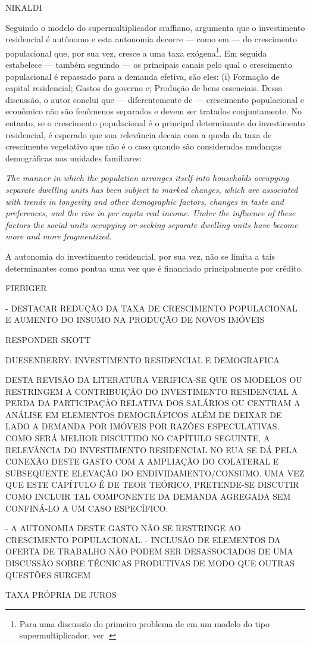 NIKALDI

Seguindo o modelo do supermultiplicador sraffiano, \textcite{gowans_introducing_2014} argumenta que o investimento residencial é autônomo e esta autonomia decorre --- como em \textcite{hansen_economic_1939} --- do crescimento populacional que, por sua vez, cresce a uma taxa exógena\footnote{
	Para uma discussão do primeiro problema de \textcite{harrod_essay_1939} em um modelo do tipo supermultiplicador, ver \textcite{allain_demographic_2018}.
}.
Em seguida estabelece --- também seguindo \textcite{hansen_economic_1939} --- os principais canais pelo qual o crescimento populacional é repassado para a demanda efetiva, são eles: (i) Formação de capital residencial; Gastos do governo e; Produção de bens essenciais.
Dessa discussão, o autor conclui que --- diferentemente de \textcite{robinson_model_1962} --- crescimento populacional e econômico não são fenômenos separados e devem ser tratados conjuntamente.
No entanto, se o crescimento populacional é o principal determinante do investimento residencial, é esperado que sua relevância decaia com a queda da taxa de crescimento vegetativo que não é o caso quando são consideradas mudanças demográficas nas unidades familiares:

\begin{citacao}
	\textit{The manner in which the population arranges itself into households
	occupying separate dwelling units has been subject to marked changes,
	which are associated with trends in longevity and other demographic
	factors, changes in taste and preferences, and the rise in per capita real
	income. Under the influence of these factors the social units occupying
	or seeking separate dwelling units have become more and more fragmentized.}
	\cite[p.~11]{grebler_capital_1956}
\end{citacao}

A autonomia do investimento residencial, por sua vez, não se limita a tais determinantes como pontua \textcite{fiebiger_semi-autonomous_2018} uma vez que é financiado principalmente por crédito.

FIEBIGER

- DESTACAR REDUÇÃO DA TAXA DE CRESCIMENTO POPULACIONAL E AUMENTO DO INSUMO NA PRODUÇÃO DE NOVOS IMÓVEIS


RESPONDER SKOTT


DUESENBERRY: INVESTIMENTO RESIDENCIAL E DEMOGRAFICA


DESTA REVISÃO DA LITERATURA VERIFICA-SE QUE OS MODELOS OU RESTRINGEM A CONTRIBUIÇÃO DO INVESTIMENTO RESIDENCIAL A PERDA DA PARTICIPAÇÃO RELATIVA DOS SALÁRIOS OU CENTRAM A ANÁLISE EM ELEMENTOS DEMOGRÁFICOS ALÉM DE DEIXAR DE LADO A DEMANDA POR IMÓVEIS POR RAZÕES ESPECULATIVAS. COMO SERÁ MELHOR DISCUTIDO NO CAPÍTULO SEGUINTE, A RELEVÂNCIA DO INVESTIMENTO RESIDENCIAL NO EUA SE DÁ PELA CONEXÃO DESTE GASTO COM A AMPLIAÇÃO DO COLATERAL E SUBSEQUENTE ELEVAÇÃO DO ENDIVIDAMENTO/CONSUMO. UMA VEZ QUE ESTE CAPÍTULO É DE TEOR TEÓRICO, PRETENDE-SE DISCUTIR COMO INCLUIR TAL COMPONENTE DA DEMANDA AGREGADA SEM CONFINÁ-LO A UM CASO ESPECÍFICO.

- A AUTONOMIA DESTE GASTO NÃO SE RESTRINGE AO CRESCIMENTO POPULACIONAL.
- INCLUSÃO DE ELEMENTOS DA OFERTA DE TRABALHO NÃO PODEM SER DESASSOCIADOS DE UMA DISCUSSÃO SOBRE TÉCNICAS PRODUTIVAS DE MODO QUE OUTRAS QUESTÕES SURGEM

TAXA PRÓPRIA DE JUROS

